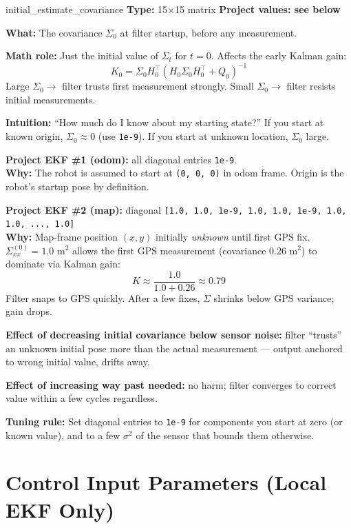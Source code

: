 \documentclass[11pt,a4paper]{article}
\begin{document}
\begin{paramcard}{initial\_estimate\_covariance}
\textbf{Type:} 15$\times$15 matrix \quad \textbf{Project values: see below}

\textbf{What:} The covariance $\Sigma_0$ at filter startup, before any measurement.

\textbf{Math role:} Just the initial value of $\Sigma_t$ for $t = 0$. Affects the early Kalman gain:
\[
K_0 = \Sigma_0 H_0^\top (H_0 \Sigma_0 H_0^\top + Q_0)^{-1}
\]
Large $\Sigma_0 \to$ filter trusts first measurement strongly. Small $\Sigma_0 \to$ filter resists initial measurements.

\textbf{Intuition:} ``How much do I know about my starting state?'' If you start at known origin, $\Sigma_0 \approx 0$ (use \texttt{1e-9}). If you start at unknown location, $\Sigma_0$ large.

\textbf{Project EKF \#1 (odom):} all diagonal entries \texttt{1e-9}. \\
\textbf{Why:} The robot is assumed to start at \texttt{(0, 0, 0)} in odom frame. Origin is the robot's startup pose by definition.

\textbf{Project EKF \#2 (map):} diagonal \texttt{[1.0, 1.0, 1e-9, 1.0, 1.0, 1e-9, 1.0, 1.0, ..., 1.0]} \\
\textbf{Why:} Map-frame position $(x, y)$ initially \emph{unknown} until first GPS fix. $\Sigma_{xx}^{(0)} = 1.0$ m$^2$ allows the first GPS measurement (covariance 0.26 m$^2$) to dominate via Kalman gain:
\[
K \approx \frac{1.0}{1.0 + 0.26} \approx 0.79
\]
Filter snaps to GPS quickly. After a few fixes, $\Sigma$ shrinks below GPS variance; gain drops.

\textbf{Effect of decreasing initial covariance below sensor noise:} filter ``trusts'' an unknown initial pose more than the actual measurement --- output anchored to wrong initial value, drifts away.

\textbf{Effect of increasing way past needed:} no harm; filter converges to correct value within a few cycles regardless.

\textbf{Tuning rule:} Set diagonal entries to \texttt{1e-9} for components you start at zero (or known value), and to a few $\sigma^2$ of the sensor that bounds them otherwise.
\end{paramcard}

\section{Control Input Parameters (Local EKF Only)}
\end{document}
